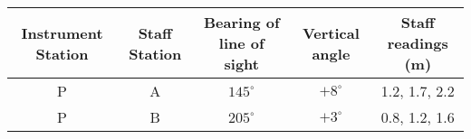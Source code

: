 \begin{center}
  \label{tab:q48-tacho}
  \setlength{\tabcolsep}{6pt}
  \renewcommand{\arraystretch}{1.2}
  \begin{tabular}{|c|c|c|c|c|}
    \hline
    \textbf{Instrument Station} & \textbf{Staff Station} &
    \textbf{Bearing of line of sight} & \textbf{Vertical angle} &
    \textbf{Staff readings (m)} \\ \hline
    P & A & $145^\circ$ & $+8^\circ$ & 1.2, 1.7, 2.2 \\ \hline
    P & B & $205^\circ$ & $+3^\circ$ & 0.8, 1.2, 1.6 \\ \hline
  \end{tabular}
\end{center}

